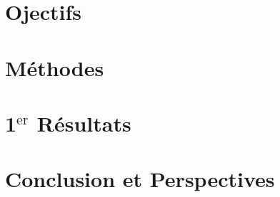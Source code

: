 \section{Ojectifs}

\section{Méthodes}

\section{1$^{\text{er}}$ Résultats}

\section{Conclusion et Perspectives}

